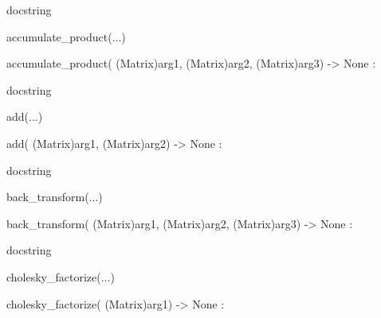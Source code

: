 \documentclass[letterpaper,10pt,english]{sphinxmanual}
\begin{document}
\begin{description}
\begin{description}
\begin{DUlineblock}{0em}
\begin{DUlineblock}{\DUlineblockindent}
\item[]
\begin{DUlineblock}{\DUlineblockindent}
\item[] docstring
\item[] 
\end{DUlineblock}
\end{DUlineblock}
\item[] accumulate\_product(...)
\item[]
\begin{DUlineblock}{\DUlineblockindent}
\item[] accumulate\_product( (Matrix)arg1, (Matrix)arg2, (Matrix)arg3) -\textgreater{} None :
\item[]
\begin{DUlineblock}{\DUlineblockindent}
\item[] docstring
\item[] 
\end{DUlineblock}
\end{DUlineblock}
\item[] add(...)
\item[]
\begin{DUlineblock}{\DUlineblockindent}
\item[] add( (Matrix)arg1, (Matrix)arg2) -\textgreater{} None :
\item[]
\begin{DUlineblock}{\DUlineblockindent}
\item[] docstring
\item[] 
\end{DUlineblock}
\end{DUlineblock}
\item[] back\_transform(...)
\item[]
\begin{DUlineblock}{\DUlineblockindent}
\item[] back\_transform( (Matrix)arg1, (Matrix)arg2, (Matrix)arg3) -\textgreater{} None :
\item[]
\begin{DUlineblock}{\DUlineblockindent}
\item[] docstring
\item[] 
\end{DUlineblock}
\end{DUlineblock}
\item[] cholesky\_factorize(...)
\item[]
\begin{DUlineblock}{\DUlineblockindent}
\item[] cholesky\_factorize( (Matrix)arg1) -\textgreater{} None :

\end{DUlineblock}
\end{DUlineblock}
\end{description}
\end{description}
\end{document}
